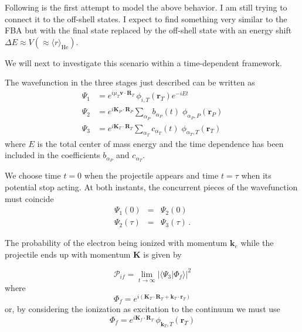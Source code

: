 Following is the first attempt to model the above behavior. I am still
trying to connect it to the off-shell states. I expect to find
something very similar to the FBA but with the final state replaced by
the off-shell state with an energy shift $\Delta E \approx V(\approx
\langle r \rangle_{\mathrm{He}})$.

We will next to investigate this scenario within a time-dependent
framework.

The wavefunction in the three stages just described can be written as
\begin{align}\label{Q:wave-funct-stage}
\Psi_{1}&= e^{i \mu_{T} \bm{v} \cdot \bm{R}_{T}} \,
\phi_{i,T}(\bm{r}_{T}) e^{- i E t}
\nonumber \\
\Psi_{2} &= e^{i \bm{K}_{P} \cdot \bm{R}_{P}} \sum_{\alpha_{P}}
b_{\alpha_{P}}(t) \; \phi_{\alpha_{P}, P}(\bm{r}_{P})
\\
\Psi_{3} &= e^{i \bm{K}_{T} \cdot \bm{R}_{T}} \sum_{\alpha_{T}}
c_{\alpha_{T}}(t) \; \phi_{\alpha_{T}, T}(\bm{r}_{T}) \nonumber
\end{align}
where $E$ is the total center of mass energy and the time dependence
has been included in the coefficients $b_{\alpha_{P}}$ and
$c_{\alpha_{T}}$.

We choose time $t=0$ when the projectile appears and time $t=\tau $
when its potential stop acting. At both instants, the concurrent pieces
of the wavefunction must coincide
%
\begin{eqnarray}\label{Q:bound-cond}
\Psi_{1}(0) &=& \Psi_{2}(0) \nonumber
  \\
\Psi_{2}(\tau) &=& \Psi_{3}(\tau) \,.
\end{eqnarray}

The probability of the electron being ionized with momentum
$\bm{k}_{e}$ while the projectile ends up with momentum $\bm{K}$ is
given by

\begin{equation}\label{Q:Prob-ion-1}
\mathcal{P}_{if} = \lim_{t \to \infty} \left|\langle \Psi_{3} |
\Phi_{f} \rangle\right|^{2}
\end{equation}
%
where
\begin{equation} \label{Q:fi-f-a}
\Phi_{f} = e^{i \left( \bm{K}_{T} \cdot \bm{R}_{T} + \bm{k}_{T}
\cdot \bm{r}_{T}\right)}
\end{equation}
%
or, by considering the ionization as excitation to the continuum we
must use
%
\begin{equation}\label{Q:fi-f-b}
\Phi_{f} = e^{i \bm{K}_{f} \cdot \bm{R}_{T}} \,
\phi_{\bm{k}_{T},T}(\bm{r}_{T})
\end{equation}

